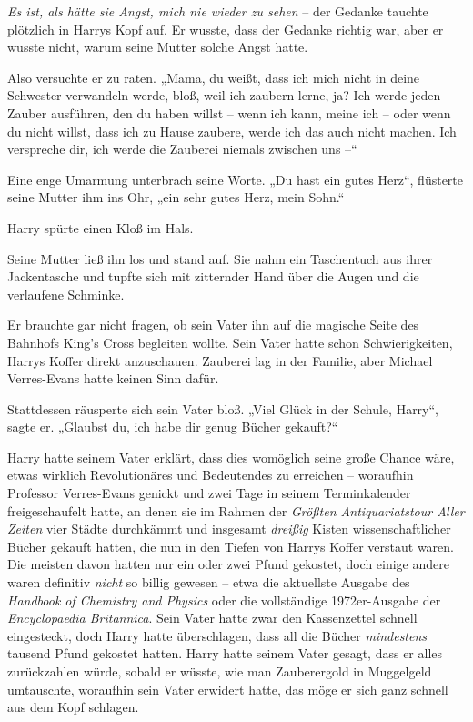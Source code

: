 {\emph{Es ist, als hätte sie Angst, mich nie wieder zu sehen} -- der Gedanke tauchte plötzlich in Harrys Kopf auf. Er wusste, dass der Gedanke richtig war, aber er wusste nicht, warum seine Mutter solche Angst hatte.

Also versuchte er zu raten. „Mama, du weißt, dass ich mich nicht in deine Schwester verwandeln werde, bloß, weil ich zaubern lerne, ja? Ich werde jeden Zauber ausführen, den du haben willst -- wenn ich kann, meine ich -- oder wenn du nicht willst, dass ich zu Hause zaubere, werde ich das auch nicht machen. Ich verspreche dir, ich werde die Zauberei niemals zwischen uns --“

Eine enge Umarmung unterbrach seine Worte. „Du hast ein gutes Herz“, flüsterte seine Mutter ihm ins Ohr, „ein sehr gutes Herz, mein Sohn.“

Harry spürte einen Kloß im Hals.

Seine Mutter ließ ihn los und stand auf. Sie nahm ein Taschentuch aus ihrer Jackentasche und tupfte sich mit zitternder Hand über die Augen und die verlaufene Schminke.

Er brauchte gar nicht fragen, ob sein Vater ihn auf die magische Seite des Bahnhofs King's Cross begleiten wollte. Sein Vater hatte schon Schwierigkeiten, Harrys Koffer direkt anzuschauen. Zauberei lag in der Familie, aber Michael Verres-Evans hatte keinen Sinn dafür.

Stattdessen räusperte sich sein Vater bloß. „Viel Glück in der Schule, Harry“, sagte er. „Glaubst du, ich habe dir genug Bücher gekauft?“

Harry hatte seinem Vater erklärt, dass dies womöglich seine große Chance wäre, etwas wirklich Revolutionäres und Bedeutendes zu erreichen -- woraufhin Professor Verres-Evans genickt und zwei Tage in seinem Terminkalender freigeschaufelt hatte, an denen sie im Rahmen der \emph{Größten Antiquariatstour Aller Zeiten} vier Städte durchkämmt und insgesamt \emph{dreißig} Kisten wissenschaftlicher Bücher gekauft hatten, die nun in den Tiefen von Harrys Koffer verstaut waren. Die meisten davon hatten nur ein oder zwei Pfund gekostet, doch einige andere waren definitiv \emph{nicht} so billig gewesen -- etwa die aktuellste Ausgabe des \emph{Handbook of Chemistry and Physics} oder die vollständige 1972er-Ausgabe der \emph{Encyclopaedia Britannica}. Sein Vater hatte zwar den Kassenzettel schnell eingesteckt, doch Harry hatte überschlagen, dass all die Bücher \emph{mindestens} tausend Pfund gekostet hatten. Harry hatte seinem Vater gesagt, dass er alles zurückzahlen würde, sobald er wüsste, wie man Zauberergold in Muggelgeld umtauschte, woraufhin sein Vater erwidert hatte, das möge er sich ganz schnell aus dem Kopf schlagen.

}
